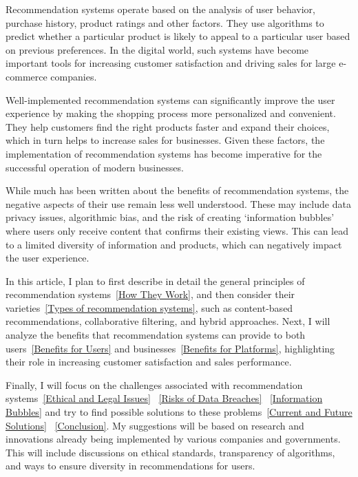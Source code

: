 \documentclass[10pt,twoside,slovak,a4paper]{article}
\begin{document}
Recommendation systems operate based on the analysis of user behavior, purchase history, product ratings and other factors. They use algorithms to predict whether a particular product is likely to appeal to a particular user based on previous preferences. In the digital world, such systems have become important tools for increasing customer satisfaction and driving sales for large e-commerce companies\cite{store}.

Well-implemented recommendation systems can significantly improve the user experience\cite{experience} by making the shopping process more personalized\cite{closeness} and convenient. They help customers find the right products faster and expand their choices, which in turn helps to increase sales for businesses\cite{comerce}. Given these factors, the implementation of recommendation systems has become imperative for the successful operation of modern businesses\cite{comerce}.


While much has been written about the benefits of recommendation systems, the negative aspects of their use remain less well understood. These may include data privacy issues, algorithmic bias, and the risk of creating ‘information bubbles’\cite{boubble} where users only receive content that confirms their existing views. This can lead to a limited diversity of information and products\cite{trouble}, which can negatively impact the user experience.

In this article, I plan to first describe in detail the general principles of recommendation systems~\ref{How They Work}, and then consider their varieties~\ref{Types of recommendation systems}, such as content-based recommendations, collaborative filtering, and hybrid approaches. Next, I will analyze the benefits that recommendation systems can provide to both users~\ref{Benefits for Users} and businesses~\ref{Benefits for Platforms}, highlighting their role in increasing customer satisfaction and sales performance.

Finally, I will focus on the challenges associated with recommendation systems~\ref{Ethical and Legal Issues} ~\ref{Risks of Data Breaches} ~\ref{Information Bubbles} and try to find possible solutions to these problems~\ref{Current and Future Solutions} ~\ref{Conclusion}. My suggestions will be based on research and innovations already being implemented by various companies and governments. This will include discussions on ethical standards, transparency of algorithms, and ways to ensure diversity in recommendations for users.
\end{document}
